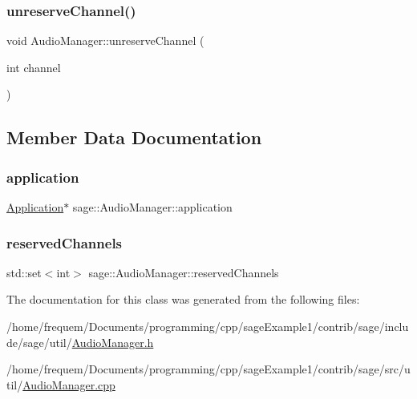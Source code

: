 \subsubsection{\texorpdfstring{unreserveChannel()}{unreserveChannel()}}
{\footnotesize\ttfamily void Audio\+Manager\+::unreserve\+Channel (\begin{DoxyParamCaption}\item[{int}]{channel }\end{DoxyParamCaption})}



\subsection{Member Data Documentation}
\mbox{\label{classsage_1_1AudioManager_af7c3bc03cba5e7460e45b03ca8a9bf01}} 
\subsubsection{\texorpdfstring{application}{application}}
{\footnotesize\ttfamily \mbox{\hyperlink{classsage_1_1Application}{Application}}$\ast$ sage\+::\+Audio\+Manager\+::application\hspace{0.3cm}{\ttfamily [private]}}

\mbox{\label{classsage_1_1AudioManager_a33e6f086e5dd82256d9b38edf6a56521}} 
\subsubsection{\texorpdfstring{reservedChannels}{reservedChannels}}
{\footnotesize\ttfamily std\+::set$<$int$>$ sage\+::\+Audio\+Manager\+::reserved\+Channels\hspace{0.3cm}{\ttfamily [private]}}



The documentation for this class was generated from the following files\+:\begin{DoxyCompactItemize}
\item 
/home/frequem/\+Documents/programming/cpp/sage\+Example1/contrib/sage/include/sage/util/\mbox{\hyperlink{AudioManager_8h}{Audio\+Manager.\+h}}\item 
/home/frequem/\+Documents/programming/cpp/sage\+Example1/contrib/sage/src/util/\mbox{\hyperlink{AudioManager_8cpp}{Audio\+Manager.\+cpp}}\end{DoxyCompactItemize}

